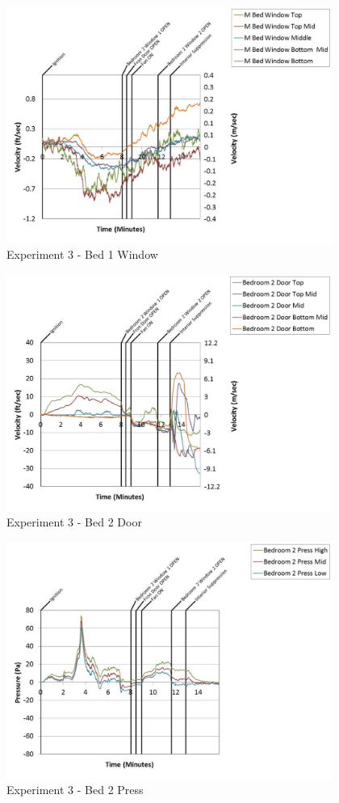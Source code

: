 \documentclass{article}
\begin{document}
\begin{appendices}
	\begin{figure}[h!]
		\centering
		\includegraphics[height=3.05in]{0_Images/Results_Charts/Exp_3_Charts/Bed1Window.pdf}
		\caption{Experiment 3 - Bed 1 Window}
	\end{figure}
 
	\clearpage

	\begin{figure}[h!]
		\centering
		\includegraphics[height=3.05in]{0_Images/Results_Charts/Exp_3_Charts/Bed2Door.pdf}
		\caption{Experiment 3 - Bed 2 Door}
	\end{figure}
 

	\begin{figure}[h!]
		\centering
		\includegraphics[height=3.05in]{0_Images/Results_Charts/Exp_3_Charts/Bed2Press.pdf}
		\caption{Experiment 3 - Bed 2 Press}
	\end{figure}
 

\end{appendices}
\end{document}
